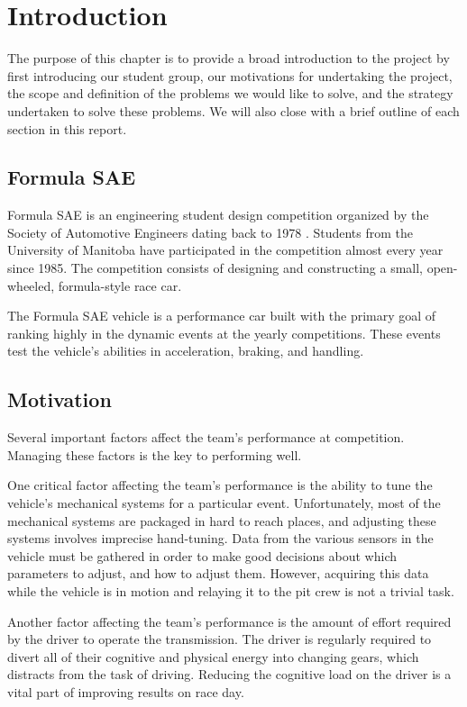 \chapter{Introduction\label{cha:introduction}}

The purpose of this chapter is to provide a broad introduction to the project by first introducing our student group, our motivations for undertaking the project, the scope and definition of the problems we would like to solve, and the strategy undertaken to solve these problems. We will also close with a brief outline of each section in this report.

\section{Formula SAE}

Formula SAE is an engineering student design competition organized by the Society of Automotive Engineers dating back to 1978 \cite{fsaehistory}. Students from the University of Manitoba have participated in the competition almost every year since 1985. The competition consists of designing and constructing a small, open-wheeled, formula-style race car.

The Formula SAE vehicle is a performance car built with the primary goal of ranking highly in the dynamic events at the yearly competitions. These events test the vehicle's abilities in acceleration, braking, and handling. 

\section{Motivation}

Several important factors affect the team's performance at competition. Managing these factors is the key to performing well.

One critical factor affecting the team's performance is the ability to tune the vehicle's mechanical systems for a particular event. Unfortunately, most of the mechanical systems are packaged in hard to reach places, and adjusting these systems involves imprecise hand-tuning. Data from the various sensors in the vehicle must be gathered in order to make good decisions about which parameters to adjust, and how to adjust them. However, acquiring this data while the vehicle is in motion and relaying it to the pit crew is not a trivial task.

Another factor affecting the team's performance is the amount of effort required by the driver to operate the transmission. The driver is regularly required to divert all of their cognitive and physical energy into changing gears, which distracts from the task of driving. Reducing the cognitive load on the driver is a vital part of improving results on race day.

